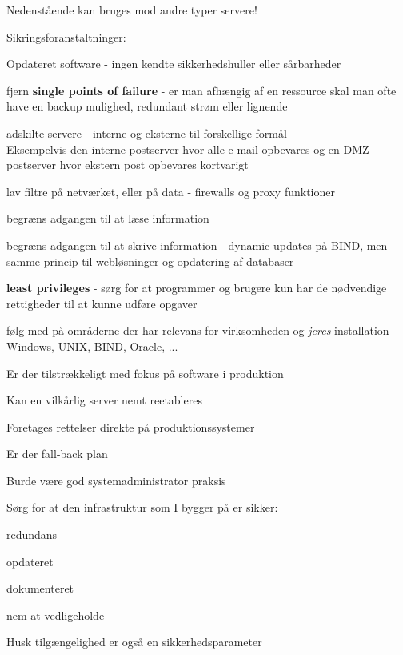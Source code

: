 \documentclass[Screen16to9,17pt]{foils}
\begin{document}
\begin{list1}
  \item Nedenstående kan bruges mod andre typer servere!
\item Sikringsforanstaltninger:
  \begin{list2}
  \item Opdateret software - ingen kendte sikkerhedshuller eller
  sårbarheder
\item fjern {\bfseries single points of failure} - er man afhængig af
  en ressource skal man ofte have en backup mulighed, redundant strøm
  eller lignende
\item adskilte servere - interne og eksterne til forskellige formål\\
Eksempelvis den interne postserver hvor alle e-mail opbevares og en
DMZ-postserver hvor ekstern post opbevares kortvarigt
\item lav filtre på netværket, eller på data - firewalls og proxy
  funktioner
\item begræns adgangen til at læse information
\item begræns adgangen til at skrive information - dynamic updates på
  BIND, men samme princip til webløsninger og opdatering af databaser
\item {\bfseries least privileges} - sørg for at programmer og brugere
  kun har de nødvendige rettigheder til at kunne udføre opgaver
\item følg med på områderne der har relevans for virksomheden og
  \emph{jeres} installation - Windows, UNIX, BIND, Oracle, ...
  \end{list2}
\end{list1}



\begin{list1}
\item Er der tilstrækkeligt med fokus på software i produktion
\item Kan en vilkårlig server nemt reetableres
\item Foretages rettelser direkte på produktionssystemer
\item Er der fall-back plan
\item Burde være god systemadministrator praksis
\end{list1}




\begin{list1}
\item Sørg for at den infrastruktur som I bygger på er sikker:
\begin{list2}
 \item redundans
       \item opdateret
        \item dokumenteret
        \item nem at vedligeholde
\end{list2}

\item  Husk tilgængelighed er også en sikkerhedsparameter
\end{list1}


\slidenext
\end{document}
